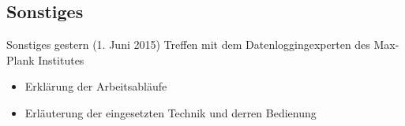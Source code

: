 \documentclass{beamer}
\begin{document}
\begin{frame}
 \section{Sonstiges}
 \begin{block}{Sonstiges}
  gestern (1. Juni 2015) Treffen mit dem Datenloggingexperten des Max-Plank Institutes
  \begin{itemize}
  \item Erklärung der Arbeitsabläufe
  \item Erläuterung der eingesetzten Technik und derren Bedienung
  \end{itemize}
  \end{block}
\end{frame}
\end{document}
